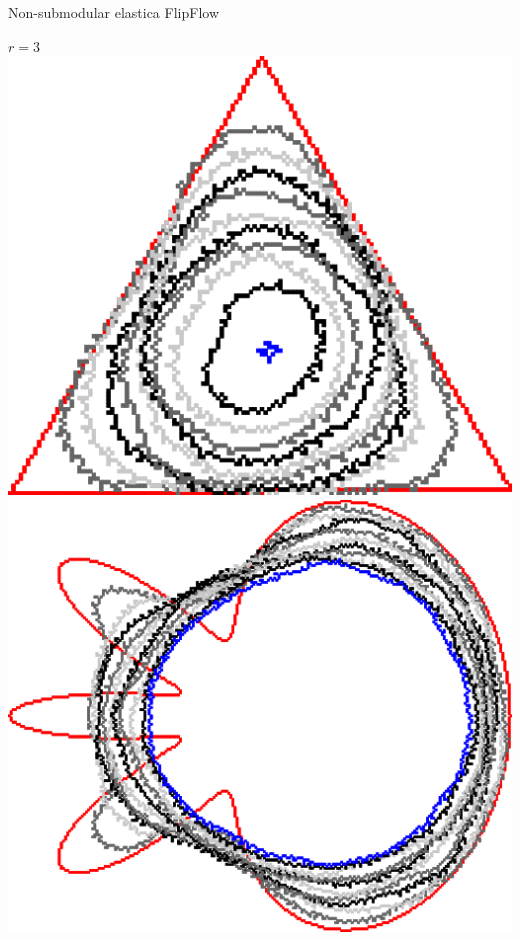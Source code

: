 \begin{frame}
{Non-submodular elastica}
{FlipFlow}

\begin{minipage}{0.49\textwidth}
\center
$r=3$\\
\includegraphics[scale=0.2]{figures/non-submodular-elastica/radius-effect/triangle-r3.png}\\[1em]
\includegraphics[scale=0.2]{figures/non-submodular-elastica/radius-effect/flower-r3.png}

\end{minipage}
\end{frame}
